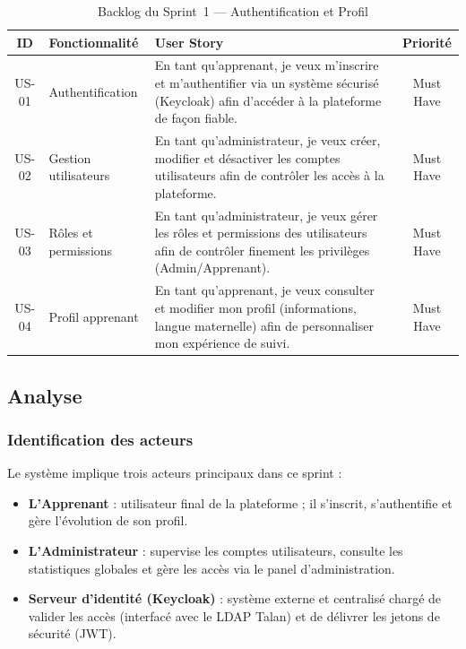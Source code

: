 \begin{table}[H]
\centering
\small
\renewcommand{\arraystretch}{1.3}
\begin{tabular}{|c|p{2.8cm}|p{7.5cm}|c|}
\hline
\rowcolor[gray]{0.88}
\textbf{ID} & \textbf{Fonctionnalité} & \textbf{User Story} & \textbf{Priorité} \\
\hline
US-01 & Authentification &
    En tant qu'apprenant, je veux m'inscrire et m'authentifier via un système sécurisé (Keycloak)
    afin d'accéder à la plateforme de façon fiable. & Must Have \\
\hline
US-02 & Gestion utilisateurs &
    En tant qu'administrateur, je veux créer, modifier et désactiver les
    comptes utilisateurs afin de contrôler les accès à la plateforme. & Must Have \\
\hline
US-03 & Rôles et permissions &
    En tant qu'administrateur, je veux gérer les rôles et permissions des
    utilisateurs afin de contrôler finement les privilèges (Admin/Apprenant). & Must Have \\
\hline
US-04 & Profil apprenant &
    En tant qu'apprenant, je veux consulter et modifier mon profil (informations,
    langue maternelle) afin de personnaliser mon expérience de suivi. & Must Have \\
\hline
\end{tabular}
\caption{Backlog du Sprint~1 --- Authentification et Profil}
\label{tab:backlog-sprint1}
\end{table}

\subsection{Analyse}

\subsubsection{Identification des acteurs}

Le système implique trois acteurs principaux dans ce sprint :

\begin{itemize}
    \item \textbf{L'Apprenant} : utilisateur final de la plateforme ; il s'inscrit,
          s'authentifie et gère l'évolution de son profil.
    \item \textbf{L'Administrateur} : supervise les comptes utilisateurs, consulte les statistiques globales
          et gère les accès via le panel d'administration.
    \item \textbf{Serveur d'identité (Keycloak)} : système externe et centralisé chargé de valider les accès (interfacé avec le LDAP Talan) et de délivrer les jetons de sécurité (JWT).
\end{itemize}

